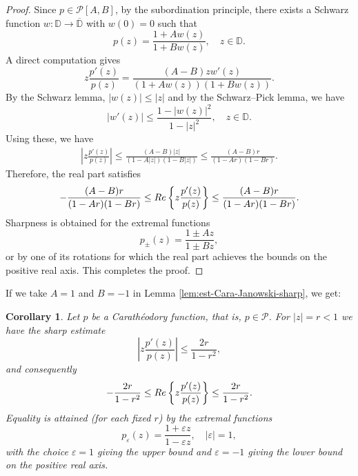 \documentclass[12pt,a4paper]{amsart}
\numberwithin{equation}{section}
\newtheorem{corollary}{Corollary}[section]
\theoremstyle{remark}
\begin{document}
\begin{proof}
Since $p\in \mathcal{P}[A,B]$, by the subordination principle, there exists a Schwarz function $w:\mathbb{D}\to\overline{\mathbb{D}}$ with $w(0)=0$ such that
\[
p(z)=\frac{1+A w(z)}{1+B w(z)}, \quad z\in \mathbb{D}.
\]
A direct computation gives
\[
z\frac{p'(z)}{p(z)} = \frac{(A-B) z w'(z)}{(1+A w(z))(1+B w(z))}.
\]
By the Schwarz lemma, \(|w(z)| \le |z|\) and by the Schwarz–Pick lemma, we have
\begin{equation*}
|w'(z)| \le \frac{1-|w(z)|^2}{1-|z|^2},\quad  z\in\mathbb D.
\end{equation*}
Using these, we have
\begin{align*}
\left| z \frac{p'(z)}{p(z)} \right|
\le \frac{(A-B) |z|}{(1-A |z|)(1-B |z|)}
\le \frac{(A-B) r}{(1-A r)(1-B r)}.
\end{align*}
Therefore, the real part satisfies
\[
-\frac{(A-B)r}{(1-A r)(1-B r)} \le {\rm Re}\left\{ z \frac{p'(z)}{p(z)} \right\} \le \frac{(A-B)r}{(1-A r)(1-B r)}.
\]
Sharpness is obtained for the extremal functions
\[
p_\pm(z) = \frac{1 \pm A z}{1 \pm B z},
\]
or by one of its rotations for which the real part achieves the bounds on the positive real axis. This completes the proof. 
\end{proof}


If we take $A=1$ and $B=-1$ in Lemma \ref{lem:est-Cara-Janowski-sharp}, we get:
\begin{corollary}%
Let \(p\) be a Carath\'eodory function, that is, \(p\in\mathcal P\).  
For \(|z|=r<1\) we have the sharp estimate
\[
\left| z\frac{p'(z)}{p(z)}\right| \le \frac{2r}{1-r^2},
\]
and consequently
\[
-\frac{2r}{1-r^2} \le {\rm Re}\left\{ z\frac{p'(z)}{p(z)} \right\} \le \frac{2r}{1-r^2}.
\]
Equality is attained (for each fixed \(r\)) by the extremal functions
\[
p_\varepsilon(z)=\frac{1+\varepsilon z}{1-\varepsilon z},\quad |\varepsilon|=1,
\]
with the choice \(\varepsilon=1\) giving the upper bound and \(\varepsilon=-1\) giving the lower bound on the positive real axis.
\end{corollary}





\end{document}
